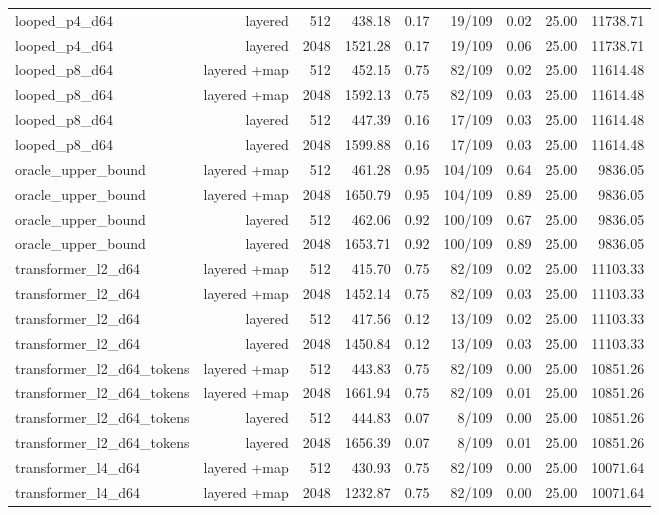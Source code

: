 \begin{table}[t]
\begin{adjustbox}{max width=\linewidth}
\begin{tabular}{lrrrrrrrr}
looped\_p4\_d64 & layered & 512 & 438.18 & 0.17 & 19/109 & 0.02 & 25.00 & 11738.71 \\
looped\_p4\_d64 & layered & 2048 & 1521.28 & 0.17 & 19/109 & 0.06 & 25.00 & 11738.71 \\
looped\_p8\_d64 & layered +map & 512 & 452.15 & 0.75 & 82/109 & 0.02 & 25.00 & 11614.48 \\
looped\_p8\_d64 & layered +map & 2048 & 1592.13 & 0.75 & 82/109 & 0.03 & 25.00 & 11614.48 \\
looped\_p8\_d64 & layered & 512 & 447.39 & 0.16 & 17/109 & 0.03 & 25.00 & 11614.48 \\
looped\_p8\_d64 & layered & 2048 & 1599.88 & 0.16 & 17/109 & 0.03 & 25.00 & 11614.48 \\
oracle\_upper\_bound & layered +map & 512 & 461.28 & 0.95 & 104/109 & 0.64 & 25.00 & 9836.05 \\
oracle\_upper\_bound & layered +map & 2048 & 1650.79 & 0.95 & 104/109 & 0.89 & 25.00 & 9836.05 \\
oracle\_upper\_bound & layered & 512 & 462.06 & 0.92 & 100/109 & 0.67 & 25.00 & 9836.05 \\
oracle\_upper\_bound & layered & 2048 & 1653.71 & 0.92 & 100/109 & 0.89 & 25.00 & 9836.05 \\
transformer\_l2\_d64 & layered +map & 512 & 415.70 & 0.75 & 82/109 & 0.02 & 25.00 & 11103.33 \\
transformer\_l2\_d64 & layered +map & 2048 & 1452.14 & 0.75 & 82/109 & 0.03 & 25.00 & 11103.33 \\
transformer\_l2\_d64 & layered & 512 & 417.56 & 0.12 & 13/109 & 0.02 & 25.00 & 11103.33 \\
transformer\_l2\_d64 & layered & 2048 & 1450.84 & 0.12 & 13/109 & 0.03 & 25.00 & 11103.33 \\
transformer\_l2\_d64\_tokens & layered +map & 512 & 443.83 & 0.75 & 82/109 & 0.00 & 25.00 & 10851.26 \\
transformer\_l2\_d64\_tokens & layered +map & 2048 & 1661.94 & 0.75 & 82/109 & 0.01 & 25.00 & 10851.26 \\
transformer\_l2\_d64\_tokens & layered & 512 & 444.83 & 0.07 & 8/109 & 0.00 & 25.00 & 10851.26 \\
transformer\_l2\_d64\_tokens & layered & 2048 & 1656.39 & 0.07 & 8/109 & 0.01 & 25.00 & 10851.26 \\
transformer\_l4\_d64 & layered +map & 512 & 430.93 & 0.75 & 82/109 & 0.00 & 25.00 & 10071.64 \\
transformer\_l4\_d64 & layered +map & 2048 & 1232.87 & 0.75 & 82/109 & 0.00 & 25.00 & 10071.64 \\

\end{tabular}
\end{adjustbox}
\end{table}
